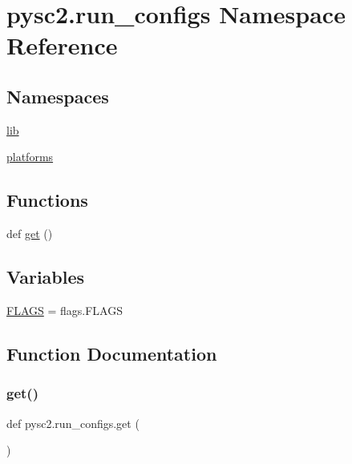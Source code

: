 \hypertarget{namespacepysc2_1_1run__configs}{}\section{pysc2.\+run\+\_\+configs Namespace Reference}
\label{namespacepysc2_1_1run__configs}
\subsection*{Namespaces}
\begin{DoxyCompactItemize}
\item 
 \mbox{\hyperlink{namespacepysc2_1_1run__configs_1_1lib}{lib}}
\item 
 \mbox{\hyperlink{namespacepysc2_1_1run__configs_1_1platforms}{platforms}}
\end{DoxyCompactItemize}
\subsection*{Functions}
\begin{DoxyCompactItemize}
\item 
def \mbox{\hyperlink{namespacepysc2_1_1run__configs_a79a4e191e37874fc0fd79a5832ccae31}{get}} ()
\end{DoxyCompactItemize}
\subsection*{Variables}
\begin{DoxyCompactItemize}
\item 
\mbox{\hyperlink{namespacepysc2_1_1run__configs_a99b9e4b2a9eec8259da8b92b1110a5d5}{F\+L\+A\+GS}} = flags.\+F\+L\+A\+GS
\end{DoxyCompactItemize}


\subsection{Function Documentation}
\mbox{\label{namespacepysc2_1_1run__configs_a79a4e191e37874fc0fd79a5832ccae31}} 
\subsubsection{\texorpdfstring{get()}{get()}}
{\footnotesize\ttfamily def pysc2.\+run\+\_\+configs.\+get (\begin{DoxyParamCaption}{ }\end{DoxyParamCaption})}

